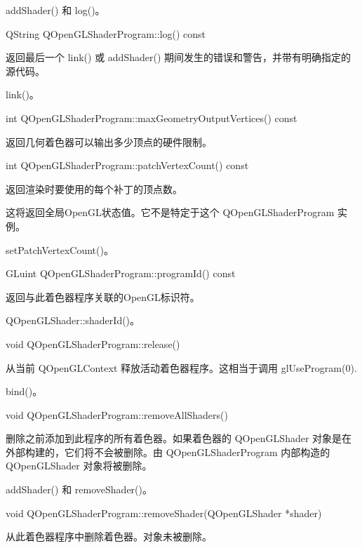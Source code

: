 \begin{seeAlso}
addShader() 和 log()。
\end{seeAlso}

QString QOpenGLShaderProgram::log() const

返回最后一个 link() 或 addShader() 期间发生的错误和警告，并带有明确指定的源代码。


\begin{seeAlso}
link()。
\end{seeAlso}

int QOpenGLShaderProgram::maxGeometryOutputVertices() const

返回几何着色器可以输出多少顶点的硬件限制。

int QOpenGLShaderProgram::patchVertexCount() const

返回渲染时要使用的每个补丁的顶点数。

\begin{notice}
这将返回全局OpenGL状态值。它不是特定于这个 QOpenGLShaderProgram 实例。
\end{notice}


\begin{seeAlso}
setPatchVertexCount()。
\end{seeAlso}

GLuint QOpenGLShaderProgram::programId() const

返回与此着色器程序关联的OpenGL标识符。


\begin{seeAlso}
QOpenGLShader::shaderId()。
\end{seeAlso}

void QOpenGLShaderProgram::release()

从当前 QOpenGLContext 释放活动着色器程序。这相当于调用 glUseProgram(0).

\begin{seeAlso}
bind()。
\end{seeAlso}

void QOpenGLShaderProgram::removeAllShaders()

删除之前添加到此程序的所有着色器。如果着色器的 QOpenGLShader 对象是在外部构建的，它们将不会被删除。由 QOpenGLShaderProgram 内部构造的 QOpenGLShader 对象将被删除。

\begin{seeAlso}
addShader() 和 removeShader()。
\end{seeAlso}

void QOpenGLShaderProgram::removeShader(QOpenGLShader *shader)

从此着色器程序中删除着色器。对象未被删除。

